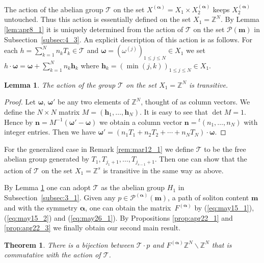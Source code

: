 \documentclass[11pt]{article}
\newtheorem{theorem}{Theorem}
\newtheorem{lemma}{Lemma}
\newcommand{\Z}{{\mathbb Z}}
\newcommand\bom{\boldsymbol{\omega}}
\newcommand\boa{\boldsymbol{\alpha}}
\newcommand{\m}{{\boldsymbol m}}
\begin{document}
The action of the abelian group ${\mathcal T}$ on the set $X^{(\boa)} = X_1 \times X_2^{(\boa)}$
keeps $X_2^{(\boa)}$ untouched.
Thus this action is essentially def\/ined on the set $X_1 = \Z^N$.
%
By Lemma \ref{lem:apr8_1} it is uniquely determined from the action of ${\mathcal T}$ on the set ${\mathcal P}(\m)$
in Subsection~\ref{subsec:4_3}.
%
An explicit description of this action is as follows.
For each $h = \sum_{k=1}^N n_k T_k \in {\mathcal T}$ and $\bom = (\omega^{(j)})_{1 \leq j \leq N} \in X_1$
we set $h \cdot \bom = \bom + \sum_{k=1}^N n_k \boldsymbol{h}_k$ where
$\boldsymbol{h}_k = (\min(j,k))_{1 \leq j \leq N} \in X_1$.


\begin{lemma}\label{lem:oct18_2}
The action of the group ${\mathcal T}$ on the set $X_1 = \Z^N$ is transitive.
\end{lemma}
\begin{proof}
Let $\boldsymbol{\omega}$, $\boldsymbol{\omega'}$ be any two elements of $\Z^N$,
thought of as column vectors.
We def\/ine the $N \times N$ matrix $M = (\boldsymbol{h}_1,\ldots,\boldsymbol{h}_N)$.
It is easy to see that $\det M = 1$.
Hence by $\boldsymbol{n} =M^{-1} (\boldsymbol{\omega'} - \boldsymbol{\omega})$
we obtain a column vector $\boldsymbol{n} = {}^t (n_1,\ldots,n_N)$ with integer entries.
Then we have $\boldsymbol{\omega'} =(n_1 T_1 + n_2 T_2 + \cdots + n_N T_N) \cdot \boldsymbol{\omega}$.
\end{proof}
%
\begin{remark}\label{rem:may8_1}
For the generalized case in Remark \ref{rem:mar12_1}
we def\/ine ${\mathcal T}$ to be the free abelian group
generated by $T_1, T_{j_1+1},\ldots, T_{j_{s-1}+1}$.
Then one can show that the action of ${\mathcal T}$ on the set $X_1=\Z^s$ is transitive
in the same way as above.
\end{remark}


By Lemma \ref{lem:oct18_2} one can adopt ${\mathcal T}$ as the abelian group $H_1$ in Subsection~\ref{subsec:3_1}.
Given any $p \in {\mathcal P}^{(\boa)}(\m)$, a path of soliton content $\m$ and with the symmetry $\boa$,
one can obtain the matrix~$F^{(\boa)}$ by (\ref{eq:may15_1}),
(\ref{eq:may15_2}) and (\ref{eq:may26_1}).
By Propositions \ref{prop:apr22_1} and \ref{prop:apr22_3} we f\/inally obtain our second main result.
\begin{theorem}\label{th:main}
There is a bijection between ${\mathcal T} \cdot p$ and $F^{(\boa)} \Z^N \backslash \Z^N$
that is commutative with the action of ${\mathcal T}$.
\end{theorem}
\end{document}
